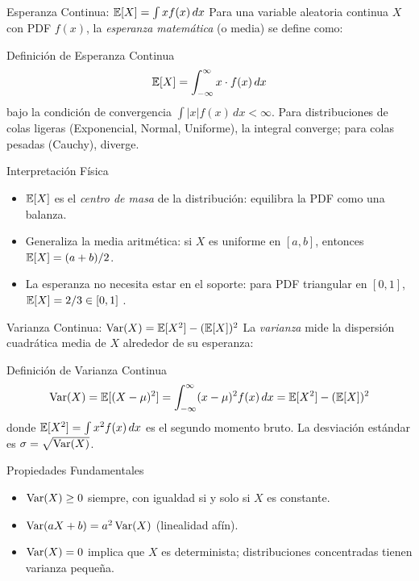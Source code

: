\documentclass[10pt, aspectratio=169]{beamer}
\begin{document}
\begin{frame}{Esperanza Continua: $\mathbb{E}[X] = \int x f(x)\,dx$}
  \footnotesize
  Para una variable aleatoria continua $X$ con PDF $f(x)$, la \emph{esperanza matemática} (o media) se define como: \pause

  \vspace{0.1cm}
  \begin{block}{Definición de Esperanza Continua}
    $$\mathbb{E}[X] = \int_{-\infty}^{\infty} x \cdot f(x)\,dx$$
    bajo la condición de convergencia $\int |x| f(x)\,dx < \infty$. Para distribuciones de colas ligeras (Exponencial, Normal, Uniforme), la integral converge; para colas pesadas (Cauchy), diverge.
  \end{block}

  \vspace{0.1cm}
  \pause
  \begin{alertblock}{Interpretación Física}
    \begin{itemize}\itemsep=0.05cm
      \item $\mathbb{E}[X]$ es el \emph{centro de masa} de la distribución: equilibra la PDF como una balanza.
      \item Generaliza la media aritmética: si $X$ es uniforme en $[a, b]$, entonces $\mathbb{E}[X] = (a+b)/2$.
      \item La esperanza no necesita estar en el soporte: para PDF triangular en $[0, 1]$, $\mathbb{E}[X] = 2/3 \in [0, 1]$ \checkmark.
    \end{itemize}
  \end{alertblock}
\end{frame}

\begin{frame}{Varianza Continua: $\operatorname{Var}(X) = \mathbb{E}[X^{2}] - (\mathbb{E}[X])^{2}$}
  \footnotesize
  La \emph{varianza} mide la dispersión cuadrática media de $X$ alrededor de su esperanza: \pause

  \vspace{0.1cm}
  \begin{block}{Definición de Varianza Continua}
    $$\operatorname{Var}(X) = \mathbb{E}[(X - \mu)^{2}] = \int_{-\infty}^{\infty} (x - \mu)^{2} f(x)\,dx = \mathbb{E}[X^{2}] - (\mathbb{E}[X])^{2}$$
    donde $\mathbb{E}[X^{2}] = \int x^{2} f(x)\,dx$ es el segundo momento bruto. La desviación estándar es $\sigma = \sqrt{\operatorname{Var}(X)}$.
  \end{block}

  \vspace{0.1cm}
  \pause
  \begin{alertblock}{Propiedades Fundamentales}
    \begin{itemize}\itemsep=0.05cm
      \item $\operatorname{Var}(X) \ge 0$ siempre, con igualdad si y solo si $X$ es constante.
      \item $\operatorname{Var}(aX + b) = a^{2} \operatorname{Var}(X)$ (linealidad afín).
      \item $\operatorname{Var}(X) = 0$ implica que $X$ es determinista; distribuciones concentradas tienen varianza pequeña.
    \end{itemize}
  \end{alertblock}
\end{frame}
\end{document}
